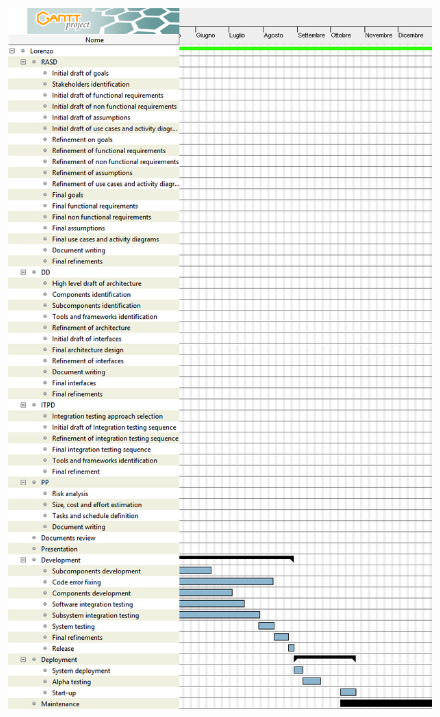\begin{figure}[H]
	\centering
	\includegraphics[height=\textheight, keepaspectratio]{resource_allocation/diagrams/ScheduleLorenzo2.png}
\end{figure}

